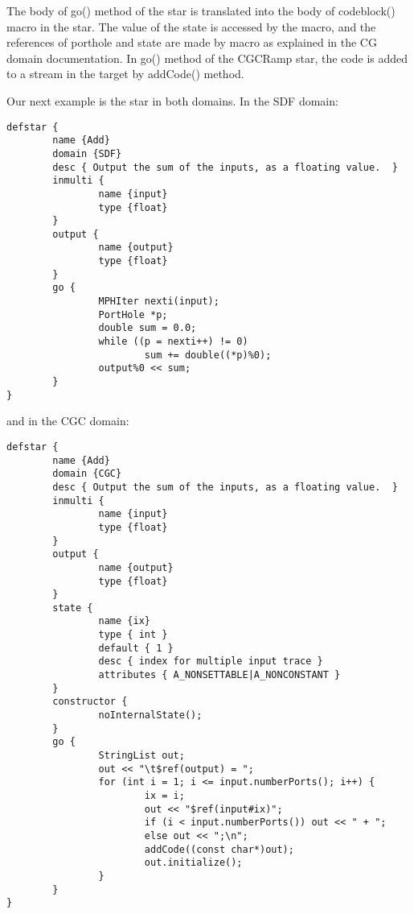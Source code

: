 The body of go() method of the 
star is translated into
the body of codeblock() macro in the 
star. The value of
the state  is accessed by the 
macro, and the references of porthole 
and state
are made by
macro as explained in the CG domain documentation. In go() method
of the CGCRamp star, the code is added to a stream in the target
by addCode() method.

Our next example is the 
star in both domains. In the SDF domain:

\begin{verbatim}
defstar {
        name {Add}
        domain {SDF}
        desc { Output the sum of the inputs, as a floating value.  }
        inmulti {
                name {input}
                type {float}
        }
        output {
                name {output}
                type {float}
        }
        go {
                MPHIter nexti(input);
                PortHole *p;
                double sum = 0.0;
                while ((p = nexti++) != 0)
                        sum += double((*p)%0);
                output%0 << sum;
        }
}
\end{verbatim}

and in the CGC domain:

\begin{verbatim}
defstar {
        name {Add}
        domain {CGC}
        desc { Output the sum of the inputs, as a floating value.  }
        inmulti {
                name {input}
                type {float}
        }
        output {
                name {output}
                type {float}
        }
        state {
                name {ix}
                type { int }
                default { 1 }
                desc { index for multiple input trace }
                attributes { A_NONSETTABLE|A_NONCONSTANT }
        }
        constructor {
                noInternalState();
        }
        go {
                StringList out;
                out << "\t$ref(output) = ";
                for (int i = 1; i <= input.numberPorts(); i++) {
                        ix = i;
                        out << "$ref(input#ix)";
                        if (i < input.numberPorts()) out << " + ";
                        else out << ";\n";
                        addCode((const char*)out);
                        out.initialize();
                }
        }
}
\end{verbatim}

